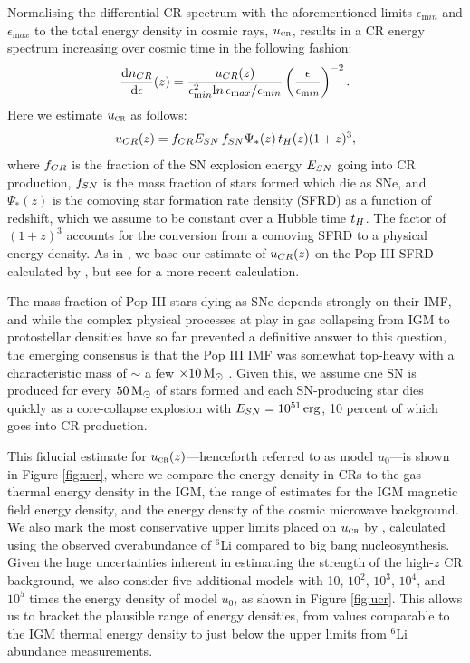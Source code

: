\documentclass[../thesis.tex]{subfiles}
\begin{document}
Normalising the differential CR spectrum with the aforementioned limits $\epsilon_{\mathrm min}$ and $\epsilon_{\mathrm max}$ to the total energy density in cosmic rays, ${u}_{\textsc{cr}}$, results in a CR energy spectrum increasing over cosmic time in the following fashion:
 \begin{equation}
 \frac{{\mathrm d}n_{\mathrm \small CR}}{{\mathrm d}\epsilon}(z) = \frac{u_{\mathrm \small CR}(z)}{\epsilon_{\mathrm min}^2{\mathrm ln}\,\epsilon_{\mathrm max}{\large /}\epsilon_{\mathrm min}}  \left( \frac{\epsilon}{\epsilon_{\mathrm min}} \right)^{-2}.
 \end{equation}
Here we estimate ${u}_{\textsc{cr}}$ as follows:
\begin{equation}
u_{\mathrm \small CR}(z) = f_{\mathrm \small CR} E_{\mathrm \small SN}\, f_{\mathrm \small SN} \Psi_{*}(z)\, t_{\mathrm \small H}(z) (1+z)^3,
\end{equation}
where $f_{\mathrm \small CR}$ is the fraction of the SN explosion energy $E_{\mathrm \small SN}$ going into CR production, $f_{\mathrm \small SN}$ is the mass fraction of stars formed which die as SNe, and $\Psi_{*}(z)$ is the comoving star formation rate density (SFRD) as a function of redshift, which we assume to be constant over a Hubble time $t_{\mathrm \small H}$. 
The factor of $(1+z)^3$ accounts for the conversion from a comoving SFRD to a physical energy density. As in \citet{Hummeletal2015}, we base our estimate of $u_{\mathrm \small CR}(z)$ on the Pop III SFRD calculated by \citet{GreifBromm2006}, but see \citet{Campisietal2011} for a more recent calculation. 

The mass fraction of Pop III stars dying as SNe depends strongly on their IMF, and while the complex physical processes at play in gas collapsing from IGM to protostellar densities have so far prevented a definitive answer to this question, the emerging consensus is that the Pop III IMF was somewhat top-heavy with a characteristic mass of $\sim$ a few $\times 10\,\mathrm{M}_{\odot}$ \citep{Bromm2013}.  
Given this, we assume one SN is produced for every $50\,\mathrm{M}_{\odot}$ of stars formed and each SN-producing star dies quickly as a core-collapse explosion with $E_{\mathrm \small SN} = 10^{51}\,\mathrm{erg}$, 10 percent of which goes into CR production.  

This fiducial estimate for ${u}_{\textsc{cr}}(z)$---henceforth referred to as model $u_0$---is shown in Figure \ref{fig:ucr}, where we compare the energy density in CRs to the gas thermal energy density in the IGM, the range of estimates for the IGM magnetic field energy density, and the energy density of the cosmic microwave background. 
We also mark the most conservative upper limits placed on ${u}_{\textsc{cr}}$ by \citet{RollindeVangioniOlive2006}, calculated using the observed overabundance of $^6$Li compared to big bang nucleosynthesis. 
Given the huge uncertainties inherent in estimating the strength of the high-$z$ CR background, we also consider five additional models with 10, $10^2$, $10^3$, $10^4$, and $10^5$ times the energy density of model $u_0$, as shown in Figure \ref{fig:ucr}.  
This allows us to bracket the plausible range of energy densities, from values comparable to the IGM thermal energy density to just below the upper limits from $^6$Li abundance measurements.
 
\end{document}

